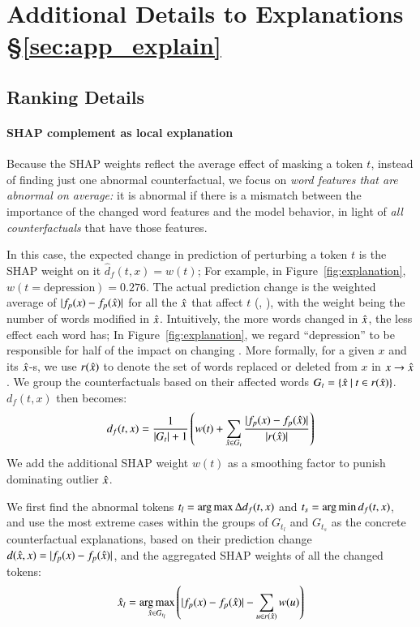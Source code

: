 \section{Additional Details to Explanations \S\ref{sec:app_explain}}
\label{appendix:explanation}


\subsection{Ranking Details}
\label{appendix:exp_rank}

\paragraph{SHAP complement as local explanation}
Because the SHAP weights reflect the average effect of masking a token $t$, instead of finding just one abnormal counterfactual, we focus on \emph{word features that are abnormal on average:} 
it is abnormal if there is a mismatch between the importance of the changed word features and the model behavior, in light of \emph{all counterfactuals} that have those features.

In this case, the expected change in prediction of perturbing a token $t$ is the SHAP weight on it $\hat{d}_f(t, x) = w(t)$; 
For example, in Figure~\ref{fig:explanation}, $w(t=\text{{depression}})=0.276$.
The actual prediction change is the weighted average of $|f_p(x)-f_p(\hat{x})|$ for all the $\hat{x}$ that affect $t$ (, ), with the weight being the number of words modified in $\hat{x}$. 
Intuitively, the more words changed in $\hat{x}$, the less effect each word has; In Figure~\ref{fig:explanation}, we regard ``depression'' to be responsible for half of the impact on changing .
More formally, for a given $x$ and its $\hat{x}$-s, we use $r(\hat{x})$ to denote the set of words replaced or deleted from $x$ in $x \rightarrow \hat{x}$.
We group the counterfactuals based on their affected words $G_t = \{\hat{x}\ |\ t \in r(\hat{x})\}$. $d_f(t, x)$ then becomes:
$$d_f(t, x) = \frac{1}{|G_t|+1} \left(w(t) + \sum_{\hat{x} \in G_t} \frac{|f_p(x)-f_p(\hat{x})|}{|r(\hat{x})|}\right)$$
We add the additional SHAP weight $w(t)$ as a smoothing factor to punish dominating outlier $\hat{x}$.

We first find the abnormal tokens $t_l = \operatorname*{arg\,max} \Delta d_f(t, x)$ and $t_s = \operatorname*{arg\,min} d_f(t, x)$, and use the most extreme cases within the groups of $G_{t_l}$ and $G_{t_s}$ as the concrete counterfactual explanations, based on their prediction change $d(\hat{x}, x) = |f_p(x)-f_p(\hat{x})|$, and the aggregated SHAP weights of all the changed tokens:
$$\hat{x}_l = \operatorname*{arg\,max}_{\hat{x} \in G_{t_l}} \left( |f_p(x)-f_p(\hat{x})| - \sum_{u\in r(\hat{x})} w(u) \right)$$ 



